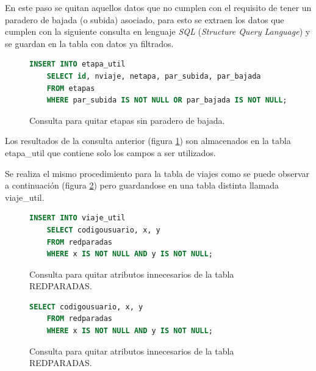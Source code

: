 \documentclass[12pt]{article}
\begin{document}
	En este paso se quitan aquellos datos que no cumplen con el requisito de tener un paradero de bajada (o subida) asociado, para esto se extraen los datos que cumplen con la siguiente consulta en lenguaje \textit{SQL} (\textit{Structure Query Language}) y se guardan en la tabla con datos ya filtrados.
	
\begin{figure}[h]
\begin{center}
\begin{lstlisting}[breaklines=true, language=SQL]
	INSERT INTO etapa_util
	SELECT id, nviaje, netapa, par_subida, par_bajada 
	FROM etapas 
	WHERE par_subida IS NOT NULL OR par_bajada IS NOT NULL;
\end{lstlisting}
\end{center}
\caption{Consulta para quitar etapas sin paradero de bajada.}
\label{fig:limpiar_datos_etapa}
\end{figure}
	
	Los resultados de la consulta anterior (figura \ref{fig:limpiar_datos_etapa}) son almacenados en la tabla etapa\_util que contiene solo los campos a ser utilizados.
	
	Se realiza el mismo procedimiento para la tabla de viajes como se puede observar a continuación (figura \ref{fig:limpiar_datos_viajes}) pero guardandose en una tabla distinta llamada viaje\_util.

\begin{figure}[h]
\begin{center}
\begin{lstlisting}[breaklines=true, language=SQL]
	INSERT INTO viaje_util
	SELECT codigousuario, x, y  
	FROM redparadas
	WHERE x IS NOT NULL AND y IS NOT NULL;
\end{lstlisting}
\end{center}
\caption{Consulta para quitar atributos innecesarios de la tabla REDPARADAS.}
\label{fig:limpiar_datos_viajes}
\end{figure}	


\begin{figure}[h]
\begin{center}
\begin{lstlisting}[breaklines=true, language=SQL]
	SELECT codigousuario, x, y  
	FROM redparadas
	WHERE x IS NOT NULL AND y IS NOT NULL;
\end{lstlisting}
\end{center}
\caption{Consulta para quitar atributos innecesarios de la tabla REDPARADAS.}
\label{fig:limpiar_datos_redparadas}
\end{figure}	
	
\end{document}

